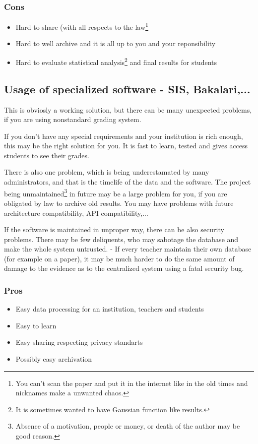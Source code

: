 \subsubsection{Cons}
\begin{itemize}
\item Hard to share (with all respects to the law\footnote{You can't scan the paper and put it in the internet like in the old times and nicknames make a unwanted chaos.}
\item Hard to well archive and it is all up to you and your reponsibility
\item Hard to evaluate statistical analysis\footnote{It is sometimes wanted to have Gaussian function like results.}  and final results for students

\end{itemize}


\subsection{Usage of specialized software - SIS, Bakalari,...}
This is obviosly a working solution, but there can be many unexpected problems, if you are using nonstandard grading system.

If you don't have any special requirements and your institution is rich enough, this may be the right solution for you. It is fast to learn, tested and gives access students to see their grades.

There is also one problem, which is being underestamated by many administrators, and that is the timelife of the data and the software.
The project being unmaintained\footnote{Absence of a motivation, people or money, or death of the author may be good reason.} in future may be a large problem for you, if you are obligated by law to archive old results.
You may have problems with future architecture compatibility, API compatibility,...

If the software is maintained in unproper way, there can be also security problems. There may be few deliquents, who may sabotage the database and make the whole system untrusted. - If every teacher maintain their own database (for example on a paper), it may be much harder to do the same amount of damage to the evidence as to the centralized system using a fatal security bug.

\subsubsection{Pros}
\begin{itemize}
\item Easy data processing for an institution, teachers and students
\item Easy to learn
\item Easy sharing respecting privacy standarts
\item Possibly easy archivation
\end{itemize}

